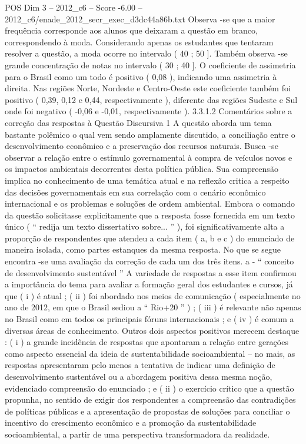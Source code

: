 \begin{textsample}{POS Dim 3 – 2012\_c6 – Score -6.00 – 2012\_c6/enade\_2012\_secr\_exec\_d3dc44a86b.txt}
Observa -se que a maior frequência corresponde aos alunos que deixaram a questão em branco, correspondendo à moda.
Considerando apenas os estudantes que tentaram resolver a questão, a moda ocorre no intervalo ( 40 ; 50 ].
Também observa -se grande concentração de notas no intervalo ( 30 ; 40 ].
O coeficiente de assimetria para o Brasil como um todo é positivo ( 0,08 ), indicando uma assimetria à direita.
Nas regiões Norte, Nordeste e Centro-Oeste este coeficiente também foi positivo ( 0,39, 0,12 e 0,44, respectivamente ), diferente das regiões Sudeste e Sul onde foi negativo ( -0,06 e -0,01, respectivamente ). 3.3.1.2 Comentários sobre a correção das respostas à Questão Discursiva 1 A questão aborda um tema bastante polêmico o qual vem sendo amplamente discutido, a conciliação entre o desenvolvimento econômico e a preservação dos recursos naturais.
Busca -se observar a relação entre o estímulo governamental à compra de veículos novos e os impactos ambientais decorrentes desta política pública.
Sua compreensão implica no conhecimento de uma temática atual e na reflexão critica a respeito das decisões governamentais em sua correlação com o cenário econômico internacional e os problemas e soluções de ordem ambiental.
Embora o comando da questão solicitasse explicitamente que a resposta fosse fornecida em um texto único ( “ redija um texto dissertativo sobre... ” ), foi significativamente alta a proporção de respondentes que atendeu a cada item ( a, b e c ) do enunciado de maneira isolada, como partes estanques da mesma resposta.
No que se segue encontra -se uma avaliação da correção de cada um dos três itens. a - “ conceito de desenvolvimento sustentável ” A variedade de respostas a esse item confirmou a importância do tema para avaliar a formação geral dos estudantes e cursos, já que ( i ) é atual ; ( ii ) foi abordado nos meios de comunicação ( especialmente no ano de 2012, em que o Brasil sediou a “ Rio+20 ” ) ; ( iii ) é relevante não apenas no Brasil como em todos os principais fóruns internacionais ; e ( iv ) é comum a diversas áreas de conhecimento.
Outros dois aspectos positivos merecem destaque : ( i ) a grande incidência de respostas que apontaram a relação entre gerações como aspecto essencial da ideia de sustentabilidade socioambiental – no mais, as respostas apresentaram pelo menos a tentativa de indicar uma definição de desenvolvimento sustentável ou a abordagem positiva dessa mesma noção, evidenciado compreensão do enunciado ; e ( ii ) o exercício crítico que a questão propunha, no sentido de exigir dos respondentes a compreensão das contradições de políticas públicas e a apresentação de propostas de soluções para conciliar o incentivo do crescimento econômico e a promoção da sustentabilidade socioambiental, a partir de uma perspectiva transformadora da realidade.

\end{textsample}
